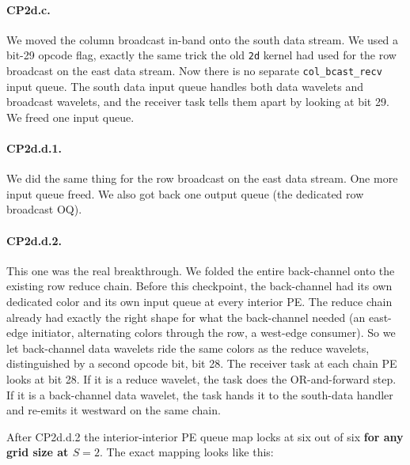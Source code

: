 \documentclass[11pt]{article}
\newcommand{\code}[1]{\texttt{#1}}
\begin{document}
\paragraph{CP2d.c.} We moved the column broadcast in-band onto
the south data stream. We used a bit-29 opcode flag, exactly
the same trick the old \code{2d} kernel had used for the row
broadcast on the east data stream. Now there is no separate
\code{col\_bcast\_recv} input queue. The south data input
queue handles both data wavelets and broadcast wavelets, and
the receiver task tells them apart by looking at bit 29. We
freed one input queue.

\paragraph{CP2d.d.1.} We did the same thing for the row
broadcast on the east data stream. One more input queue freed.
We also got back one output queue (the dedicated row broadcast
OQ).

\paragraph{CP2d.d.2.} This one was the real breakthrough. We
folded the entire back-channel onto the existing row reduce
chain. Before this checkpoint, the back-channel had its own
dedicated color and its own input queue at every interior PE.
The reduce chain already had exactly the right shape for what
the back-channel needed (an east-edge initiator, alternating
colors through the row, a west-edge consumer). So we let
back-channel data wavelets ride the same colors as the reduce
wavelets, distinguished by a second opcode bit, bit 28. The
receiver task at each chain PE looks at bit 28. If it is a
reduce wavelet, the task does the OR-and-forward step. If it
is a back-channel data wavelet, the task hands it to the
south-data handler and re-emits it westward on the same chain.

After CP2d.d.2 the interior-interior PE queue map locks at six
out of six \textbf{for any grid size at $S = 2$}. The exact
mapping looks like this:
\end{document}
